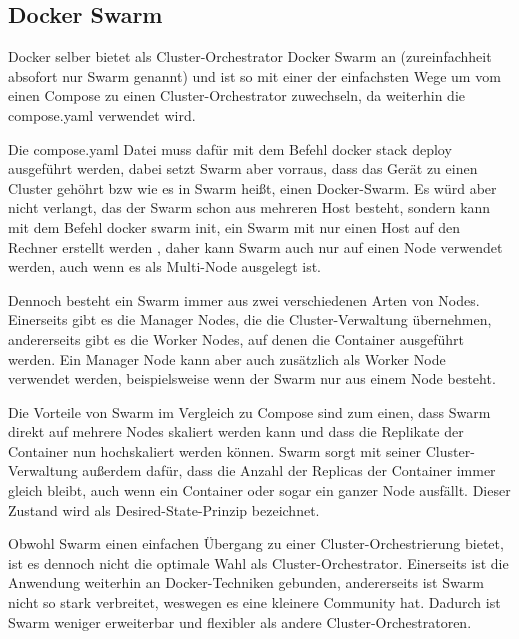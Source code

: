 \subsection{Docker Swarm}
Docker selber bietet als Cluster-Orchestrator Docker Swarm an (zureinfachheit absofort nur Swarm genannt) und ist so mit einer der einfachsten Wege um
vom einen Compose zu einen Cluster-Orchestrator zuwechseln, da weiterhin die compose.yaml verwendet wird.

Die compose.yaml Datei muss dafür mit dem Befehl docker stack deploy ausgeführt werden, dabei setzt Swarm aber vorraus, dass das Gerät zu einen Cluster gehöhrt bzw 
wie es in Swarm heißt, einen Docker-Swarm. Es würd aber nicht verlangt, das der Swarm schon aus mehreren Host besteht,
sondern kann mit dem Befehl docker swarm init, ein Swarm mit nur einen Host auf den Rechner erstellt werden \parencite[vgl. 119]{kofler2023docker}, 
daher kann Swarm auch nur auf einen Node verwendet werden, auch wenn es als Multi-Node ausgelegt ist.

Dennoch besteht ein Swarm immer aus zwei verschiedenen Arten von Nodes. 
Einerseits gibt es die Manager Nodes, die die Cluster-Verwaltung übernehmen, andererseits gibt es die Worker Nodes, auf denen die Container ausgeführt werden. 
Ein Manager Node kann aber auch zusätzlich als Worker Node verwendet werden, beispielsweise wenn der Swarm nur aus einem Node besteht.

Die Vorteile von Swarm im Vergleich zu Compose sind zum einen, dass Swarm direkt auf mehrere Nodes skaliert werden kann und dass die Replikate der Container nun hochskaliert werden können. 
Swarm sorgt mit seiner Cluster-Verwaltung außerdem dafür, dass die Anzahl der Replicas der Container immer gleich bleibt, auch wenn ein Container oder sogar ein ganzer Node ausfällt.
Dieser Zustand wird als Desired-State-Prinzip bezeichnet.

Obwohl Swarm einen einfachen Übergang zu einer Cluster-Orchestrierung bietet, ist es dennoch nicht die optimale Wahl als Cluster-Orchestrator.
Einerseits ist die Anwendung weiterhin an Docker-Techniken gebunden, andererseits ist Swarm nicht so stark verbreitet, weswegen es eine kleinere Community hat.
Dadurch ist Swarm weniger erweiterbar und flexibler als andere Cluster-Orchestratoren.

